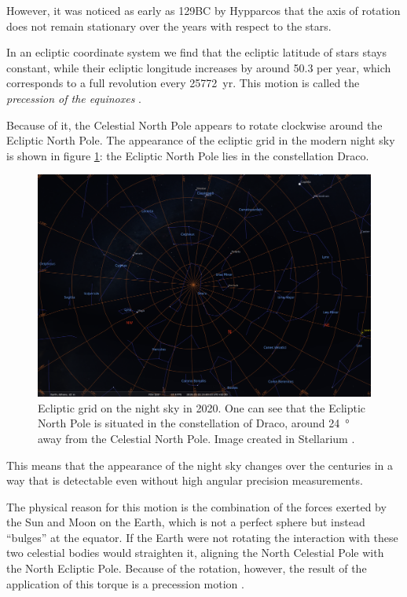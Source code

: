\documentclass[main.tex]{subfiles}
\begin{document}
However, it was noticed as early as 129BC by Hypparcos that the axis of rotation does not remain stationary over the years with respect to the stars. 

In an ecliptic coordinate system we find that the ecliptic latitude of stars stays constant, while their ecliptic longitude increases by around \SI{50.3}{\arcsec} per year, which corresponds to a full revolution every \SI{25772}{yr}.
This motion is called the \emph{precession of the equinoxes}
\cite[]{barbieriLezioniDiAstronomia2003}. 

Because of it, the Celestial North Pole appears to rotate clockwise around the Ecliptic North Pole. The appearance of the ecliptic grid in the modern night sky is shown in figure \ref{fig:ecliptic-grid}: the Ecliptic North Pole lies in the constellation Draco. 

\begin{figure}[ht]
\centering
\includegraphics[width=\textwidth]{figures/ecliptic_grid_athens_now.png}
\caption{Ecliptic grid on the night sky in 2020. One can see that the Ecliptic North Pole is situated in the constellation of Draco, around \SI{24}{\degree} away from the Celestial North Pole. Image created in Stellarium \cite[]{stellariumcontributorsStellariumAstronomySoftware2020}.}
\label{fig:ecliptic-grid}
\end{figure}

This means that the appearance of the night sky changes over the centuries in a way that is detectable even without high angular precision measurements.

The physical reason for this motion is the combination of the forces exerted by the Sun and Moon on the Earth, which is not a perfect sphere but instead ``bulges'' at the equator. 
If the Earth were not rotating the interaction with these two celestial bodies would straighten it, aligning the North Celestial Pole with the North Ecliptic Pole.
Because of the rotation, however, the result of the application of this torque is a precession motion \cite[pag.\ 59]{barbieriLezioniDiAstronomia2003}. 
\end{document}
